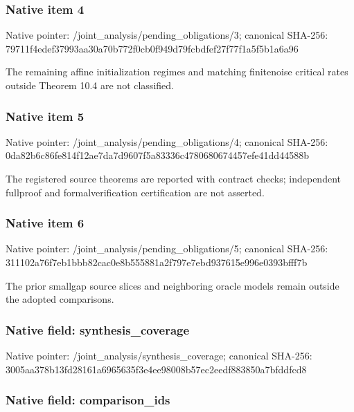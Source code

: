 \documentclass[10pt,a4paper]{article}
\begin{document}
\subsubsection{Native item 4}


Native pointer: /joint\_analysis/pending\_obligations/3; canonical SHA-256: 79711f4edef37993aa30a70b\allowbreak{}772f0cb0f949d79fcbdfef27\allowbreak{}f77f1a5f5b1a6a96


The remaining affine initialization regimes and matching finitenoise critical rates outside Theorem 10.4 are not classified.


\subsubsection{Native item 5}


Native pointer: /joint\_analysis/pending\_obligations/4; canonical SHA-256: 0da82b6c86fe814f12ae7da7\allowbreak{}d9607f5a83336c4780680674\allowbreak{}457efe41dd44588b


The registered source theorems are reported with contract checks; independent fullproof and formalverification certification are not asserted.


\subsubsection{Native item 6}


Native pointer: /joint\_analysis/pending\_obligations/5; canonical SHA-256: 311102a76f7eb1bbb82cac0e\allowbreak{}8b555881a2f797e7ebd93761\allowbreak{}5e996e0393bfff7b


The prior smallgap source slices and neighboring oracle models remain outside the adopted comparisons.


\subsubsection{Native field: synthesis\_coverage}


Native pointer: /joint\_analysis/synthesis\_coverage; canonical SHA-256: 3005aa378b13fd28161a6965\allowbreak{}635f3e4ee98008b57ec2eedf\allowbreak{}883850a7bfddfcd8



\subsubsection{Native field: comparison\_ids}
\end{document}
